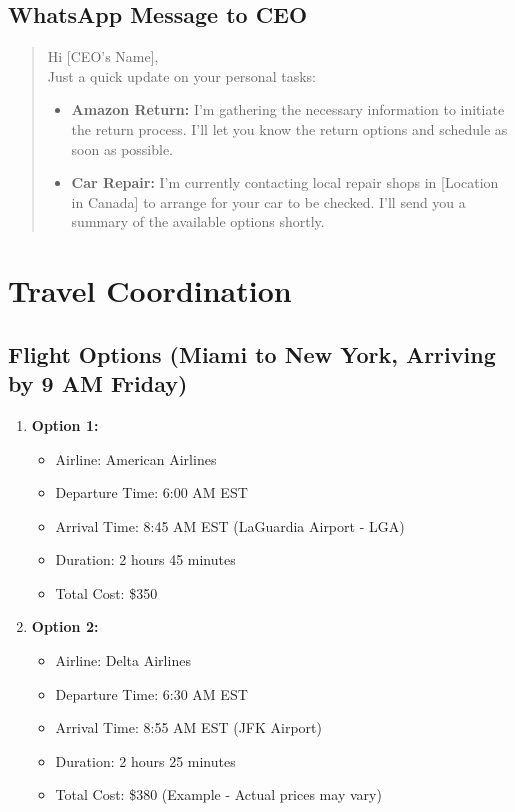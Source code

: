 \documentclass{article}
\begin{document}
\subsection{WhatsApp Message to CEO}
\begin{tcolorbox}[colback=green!10!white, colframe=black, title=WhatsApp Message to CEO]
\begin{quote}
Hi [CEO's Name],\\

Just a quick update on your personal tasks:\\

\begin{itemize}
    \item \textbf{Amazon Return:} I'm gathering the necessary information to initiate the return process. I'll let you know the return options and schedule as soon as possible.
    \item \textbf{Car Repair:} I'm currently contacting local repair shops in [Location in Canada] to arrange for your car to be checked. I'll send you a summary of the available options shortly.
\end{itemize}
\end{quote}
\end{tcolorbox}

\section{Travel Coordination}
\subsection{Flight Options (Miami to New York, Arriving by 9 AM Friday)}
\begin{enumerate}
    \item \textbf{Option 1:}
    \begin{itemize}
        \item Airline: American Airlines
        \item Departure Time: 6:00 AM EST
        \item Arrival Time: 8:45 AM EST (LaGuardia Airport - LGA)
        \item Duration: 2 hours 45 minutes
        \item Total Cost: \$350 
    \end{itemize}
    \item \textbf{Option 2:}
    \begin{itemize}
        \item Airline: Delta Airlines
        \item Departure Time: 6:30 AM EST
        \item Arrival Time: 8:55 AM EST (JFK Airport)
        \item Duration: 2 hours 25 minutes
        \item Total Cost: \$380 (Example - Actual prices may vary)
    \end{itemize}
\end{enumerate}
\end{document}
